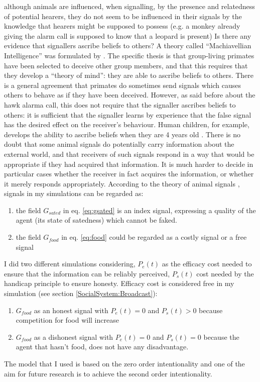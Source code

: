 although animals are influenced, when signalling, by the presence and relatedness of
potential hearers, they do not seem to be influenced in their signals by the
knowledge that hearers might be supposed to possess (e.g. a monkey already giving the
alarm call is supposed to know that a leopard is present) Is there any evidence that
signallers ascribe beliefs to others? A theory  called ``Machiavellian Intelligence''
was formulated by \citep{Byrne1988}. The specific thesis is that
group-living primates have been selected to deceive other group members, and that this
requires that they develop a ``theory of mind'': they are able to ascribe beliefs to others.
There is a general agreement that primates do sometimes send signals which causes others
to behave as if they have been deceived. However, as said before about the hawk alarma call,
 this does not require that the signaller ascribes beliefs to others: it is sufficient that
 the signaller learns by experience that the false signal has the desired effect on
 the receiver's behaviour.
Human children, for example, develops the ability to ascribe beliefs when they are 4 years old
\citep{WimmerPerner1983:ChildMind}.
There is no doubt that some animal signals do potentially carry information
about the external world, and that receivers of such signals respond in a way
that would be appropriate if they had acquired that information. It is much harder
 to decide in particular cases whether the receiver in fact acquires
the information, or whether it merely responds appropriately.
According to the theory of animal signals \citep{AnimalSignals}, signals in my simulations can
 be regarded as:
\begin{enumerate}
\item the field $G_{sated}$ in eq. \ref{eq:gsated} is an index signal, expressing
a quality of the agent (its state of satedness) which cannot be faked.
\item the field $G_{food}$ in eq. \ref{eq:food} could be regarded as a costly
signal or a free signal
\end{enumerate}
I did two different simulations considering, $P_{e}(t)$ as the efficacy cost
needed to ensure that the information can be reliably perceived, $P_{s}(t)$ cost
 needed by the handicap principle \citep{Zahavi1975:MateSelection} to ensure honesty.
Efficacy cost is considered free in my simulation (see section \ref{SocialSystem:Broadcast}):
\begin{enumerate}
\item $G_{food}$ as an honest signal with $P_{e}(t)=0$ and $P_{s}(t)>0$ because competition for food will increase
\item $G_{food}$ as a dishonest signal with $P_{e}(t)=0$ and $P_{s}(t)=0$ because the agent that hasn't food, does not have any disadvantage.
\end{enumerate}
The model that I used is based on the zero order intentionality and one of the aim
for future research is to achieve the second order intentionality.

